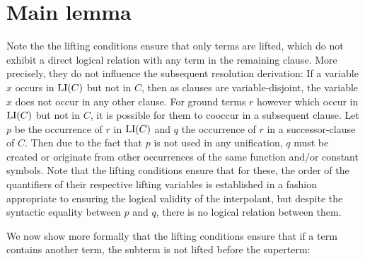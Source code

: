 




\section{Main lemma}
Note the the lifting conditions ensure that only terms are lifted,
which do not exhibit a direct logical relation with any term in the remaining clause.
More precisely, they do not influence the subsequent resolution derivation: 
If a variable $x$ occurs in $\operatorname{LI}(C)$ but not in $C$, then as clauses are variable-disjoint, the variable $x$ does not occur in any other clause.
For ground terms $r$ however which occur in $\operatorname{LI}(C)$ but not in $C$,
it is possible for them to cooccur in a subsequent clause. Let $p$ be the occurrence of $r$ in $\operatorname{LI}(C)$ and $q$ the occurrence of $r$ in a successor-clause of $C$.
Then due to the fact that $p$ is not used in any unification, 
$q$ must be created or originate from other occurrences of the same function and/or constant symbols.
Note that the lifting conditions ensure that for these, the order of the quantifiers of their respective lifting variables is established in a fashion appropriate to ensuring the logical validity of the interpolant, but despite the syntactic equality between $p$ and $q$, there is no logical relation between them.

We now show more formally that the lifting conditions ensure that if a term contains another term, the subterm is not lifted before the superterm:


